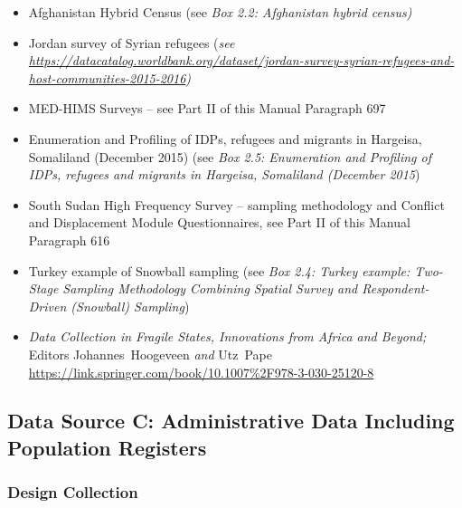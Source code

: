 \documentclass[
]{article}
\begin{document}
\begin{itemize}
\item
  Afghanistan Hybrid Census (see \emph{Box 2.2: Afghanistan hybrid census)}
\item
  Jordan survey of Syrian refugees (\emph{see
  \url{https://datacatalog.worldbank.org/dataset/jordan-survey-syrian-refugees-and-host-communities-2015-2016})}
\item
  MED-HIMS Surveys -- see Part II of this Manual Paragraph 697
\item
  Enumeration and Profiling of IDPs, refugees and migrants in
  Hargeisa, Somaliland (December 2015) (see \emph{Box 2.5: Enumeration and
  Profiling of IDPs, refugees and migrants in Hargeisa, Somaliland
  (December 2015})
\item
  South Sudan High Frequency Survey -- sampling methodology and
  Conflict and Displacement Module Questionnaires, see Part II of this
  Manual Paragraph 616
\item
  Turkey example of Snowball sampling (see \emph{Box 2.4: Turkey example:
  Two-Stage Sampling Methodology Combining Spatial Survey and
  Respondent-Driven (Snowball) Sampling})
\item
  \emph{Data Collection in Fragile States, Innovations from Africa and
  Beyond;} Editors Johannes~Hoogeveen \emph{and} Utz~Pape
  \url{https://link.springer.com/book/10.1007\%2F978-3-030-25120-8}
\end{itemize}

\hypertarget{data-source-c-administrative-data-including-population-registers}{%
\subsection{Data Source C: Administrative Data Including Population Registers}\label{data-source-c-administrative-data-including-population-registers}}

\hypertarget{design-collection-2}{%
\subsubsection{Design Collection}\label{design-collection-2}}
\end{document}
